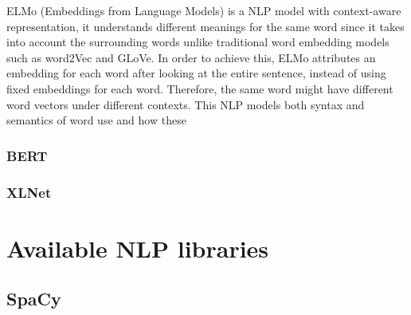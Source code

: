             ELMo (Embeddings from Language Models) is a NLP model with context-aware representation, it understands different meanings for the same word since it takes into account the surrounding words unlike traditional word embedding models such as word2Vec and GLoVe. In order to achieve this, ELMo attributes an embedding for each word after looking at the entire sentence, instead of using fixed embeddings for each word. Therefore, the same word might have different word vectors under different contexts.
            This NLP models both syntax and semantics of word use and how these







        \subsubsection{BERT}
        \subsubsection{XLNet}
        

       
\section{Available NLP libraries}


        \subsection{SpaCy}
        

